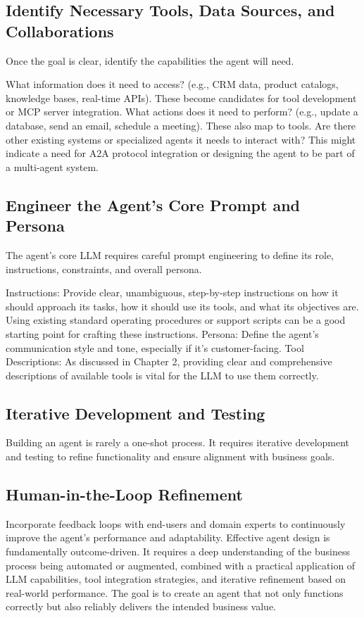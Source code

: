 \subsection{Identify Necessary Tools, Data Sources, and Collaborations}
Once the goal is clear, identify the capabilities the agent will need.

What information does it need to access? (e.g., CRM data, product catalogs, knowledge bases, real-time APIs). These become candidates for tool development or MCP server integration.
What actions does it need to perform? (e.g., update a database, send an email, schedule a meeting). These also map to tools.
Are there other existing systems or specialized agents it needs to interact with? This might indicate a need for A2A protocol integration or designing the agent to be part of a multi-agent system.

\subsection{Engineer the Agent's Core Prompt and Persona}
The agent's core LLM requires careful prompt engineering to define its role, instructions, constraints, and overall persona.

Instructions: Provide clear, unambiguous, step-by-step instructions on how it should approach its tasks, how it should use its tools, and what its objectives are. Using existing standard operating procedures or support scripts can be a good starting point for crafting these instructions.
Persona: Define the agent's communication style and tone, especially if it's customer-facing.
Tool Descriptions: As discussed in Chapter 2, providing clear and comprehensive descriptions of available tools is vital for the LLM to use them correctly.

\subsection{Iterative Development and Testing}
Building an agent is rarely a one-shot process. It requires iterative development and testing to refine functionality and ensure alignment with business goals.

\subsection{Human-in-the-Loop Refinement}
Incorporate feedback loops with end-users and domain experts to continuously improve the agent's performance and adaptability.
Effective agent design is fundamentally outcome-driven. It requires a deep understanding of the business process being automated or augmented, combined with a practical application of LLM capabilities, tool integration strategies, and iterative refinement based on real-world performance. The goal is to create an agent that not only functions correctly but also reliably delivers the intended business value.